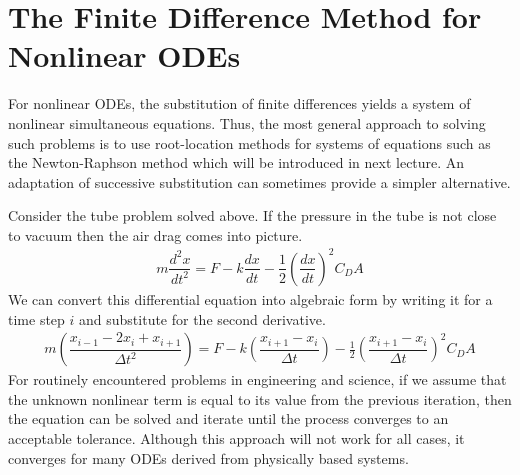 \documentclass[book.tex]{subfiles}
\begin{document}
\section{The Finite Difference Method for Nonlinear ODEs}

For nonlinear ODEs, the substitution of finite differences yields a system of nonlinear simultaneous equations. Thus, the most general approach to solving such problems is to use
root-location methods for systems of equations such as the Newton-Raphson method which will be introduced in next lecture. An adaptation of successive substitution can sometimes provide a simpler alternative.

Consider the tube problem solved above. If the pressure in the tube is not close to vacuum then the air drag comes into picture. 
\begin{align}
m\dfrac{d^2x}{dt^2} = F - k\dfrac{dx}{dt} - \dfrac{1}{2}\left (\dfrac{dx}{dt}\right )^2C_DA
\end{align}
We can convert this differential equation into algebraic form by writing it for a time step $i$ and substitute for the second derivative.
\begin{align}
m\left (\dfrac{x_{i-1}-2x_i+x_{i+1}}{\Delta t^2}\right) = F - k\left (\dfrac{x_{i+1}-x_i}{\Delta t}\right )-\frac{1}{2}\left (\dfrac{x_{i+1}-x_i}{\Delta t}\right)^2C_DA
\end{align}
 For routinely encountered problems in engineering and science, if we assume that the unknown nonlinear term is equal to its value from the previous iteration, then the equation can be solved and iterate until the process converges to an acceptable tolerance. Although this approach will not work for all cases, it converges for many ODEs derived from physically based systems.
\end{document}
